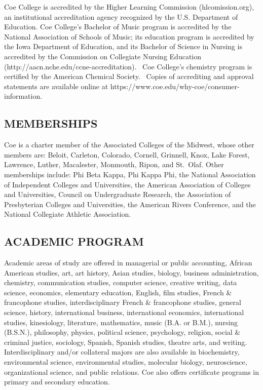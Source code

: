 \documentclass[
  letterpaper,
]{scrbook}
\begin{document}
Coe College is accredited by the Higher Learning Commission
(hlcomission.org), an institutional accreditation agency recognized by
the U.S. Department of Education. Coe College's Bachelor of Music
program is accredited by the National Association of Schools of Music;
its education program is accredited by the Iowa Department of Education,
and its Bachelor of Science in Nursing is accredited by the Commission
on Collegiate Nursing Education
(http://aacn.nche.edu/ccne-accreditation).~ Coe College's chemistry
program is certified by the American Chemical Society.~ Copies of
accrediting and approval statements are available online at
https://www.coe.edu/why-coe/consumer-information.

\hypertarget{memberships}{%
\subsection{MEMBERSHIPS}\label{memberships}}

Coe is a charter member of the Associated Colleges of the Midwest, whose
other members are: Beloit, Carleton, Colorado, Cornell, Grinnell, Knox,
Lake Forest, Lawrence, Luther, Macalester, Monmouth, Ripon, and
St.~Olaf. Other memberships include: Phi Beta Kappa, Phi Kappa Phi, the
National Association of Independent Colleges and Universities, the
American Association of Colleges and Universities, Council on
Undergraduate Research, the Association of Presbyterian Colleges and
Universities, the American Rivers Conference, and the National
Collegiate Athletic Association.

\hypertarget{academic-program}{%
\subsection{ACADEMIC PROGRAM}\label{academic-program}}

Academic areas of study are offered in managerial or public accounting,
African American studies, art, art history, Asian studies, biology,
business administration, chemistry, communication studies, computer
science, creative writing, data science, economics, elementary
education, English, film studies, French \& francophone studies,
interdisciplinary French \& francophone studies, general science,
history, international business, international economics, international
studies, kinesiology, literature, mathematics, music (B.A. or B.M.),
nursing (B.S.N.), philosophy, physics, political science, psychology,
religion, social \& criminal justice, sociology, Spanish, Spanish
studies, theatre arts, and writing. Interdisciplinary and/or collateral
majors are also available in biochemistry, environmental science,
environmental studies, molecular biology, neuroscience, organizational
science, and public relations. Coe also offers certificate programs in
primary and secondary education.
\end{document}
